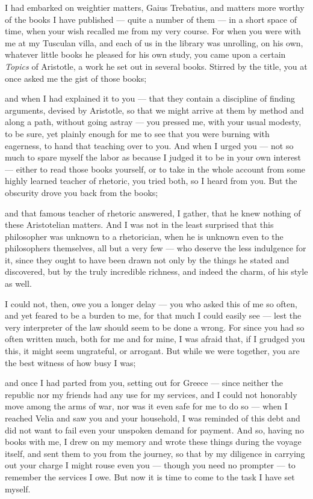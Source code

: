 
 I had embarked on weightier matters, Gaius Trebatius, and matters more worthy of the books I have published — quite a number of them — in a short space of time, when your wish recalled me from my very course. For when you were with me at my Tusculan villa, and each of us in the library was unrolling, on his own, whatever little books he pleased for his own study, you came upon a certain \textit{Topics} of Aristotle, a work he set out in several books. Stirred by the title, you at once asked me the gist of those books;

 and when I had explained it to you — that they contain a discipline of finding arguments, devised by Aristotle, so that we might arrive at them by method and along a path, without going astray — you pressed me, with your usual modesty, to be sure, yet plainly enough for me to see that you were burning with eagerness, to hand that teaching over to you. And when I urged you — not so much to spare myself the labor as because I judged it to be in your own interest — either to read those books yourself, or to take in the whole account from some highly learned teacher of rhetoric, you tried both, so I heard from you. But the obscurity drove you back from the books;

 and that famous teacher of rhetoric answered, I gather, that he knew nothing of these Aristotelian matters. And I was not in the least surprised that this philosopher was unknown to a rhetorician, when he is unknown even to the philosophers themselves, all but a very few — who deserve the less indulgence for it, since they ought to have been drawn not only by the things he stated and discovered, but by the truly incredible richness, and indeed the charm, of his style as well.

 I could not, then, owe you a longer delay — you who asked this of me so often, and yet feared to be a burden to me, for that much I could easily see — lest the very interpreter of the law should seem to be done a wrong. For since you had so often written much, both for me and for mine, I was afraid that, if I grudged you this, it might seem ungrateful, or arrogant. But while we were together, you are the best witness of how busy I was;

 and once I had parted from you, setting out for Greece — since neither the republic nor my friends had any use for my services, and I could not honorably move among the arms of war, nor was it even safe for me to do so — when I reached Velia and saw you and your household, I was reminded of this debt and did not want to fail even your unspoken demand for payment. And so, having no books with me, I drew on my memory and wrote these things during the voyage itself, and sent them to you from the journey, so that by my diligence in carrying out your charge I might rouse even you — though you need no prompter — to remember the services I owe. But now it is time to come to the task I have set myself.

